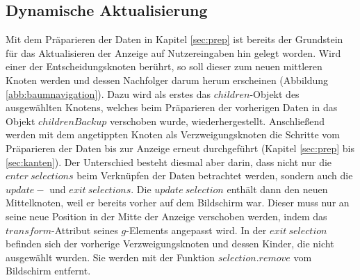 \subsection{Dynamische Aktualisierung}\label{sec:dynamische_aktual}
Mit dem Präparieren der Daten in Kapitel \ref{sec:prep} ist bereits der Grundstein für das Aktualisieren der Anzeige auf Nutzereingaben hin gelegt worden. Wird einer der Entscheidungsknoten berührt, so soll dieser zum neuen mittleren Knoten werden und dessen Nachfolger darum herum erscheinen (Abbildung \ref{abb:baumnavigation}). Dazu wird als erstes das $children$-Objekt des ausgewählten Knotens, welches beim Präparieren der vorherigen Daten in das Objekt $childrenBackup$ verschoben wurde, wiederhergestellt. Anschließend werden mit dem angetippten Knoten als Verzweigungsknoten die Schritte vom Präparieren der Daten bis zur Anzeige erneut durchgeführt (Kapitel \ref{sec:prep} bis \ref{sec:kanten}). Der Unterschied besteht diesmal aber darin, dass nicht nur die $enter\ selections$ beim Verknüpfen der Daten betrachtet werden, sondern auch die $update-$ und $exit\ selections$. Die $update\ selection$ enthält dann den neuen Mittelknoten, weil er bereits vorher auf dem Bildschirm war. Dieser muss nur an seine neue Position in der Mitte der Anzeige verschoben werden, indem das $transform$-Attribut seines $g$-Elements angepasst wird. In der $exit\ selection$ befinden sich der vorherige Verzweigungsknoten und dessen Kinder, die nicht ausgewählt wurden. Sie werden mit der Funktion $selection.remove$ vom Bildschirm entfernt. 


